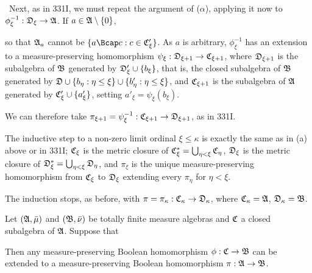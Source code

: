 {\medskip

\qquad\grheadb\ Next, as in 331I, we must repeat the argument of
($\alpha$), applying it now to
$\phi_{\xi}^{-1}:\frak D_{\xi}\to\frak A$.   If
$a\in\frak A\setminus\{0\}$,


\noindent so that $\frak A_a$ cannot be
$\{a\Bcap c:c\in\frak C'_{\xi}\}$.   As $a$ is arbitrary,
$\phi_{\xi}^{-1}$ has an extension
to a measure-preserving homomorphism
$\psi_{\xi}:\frak D_{\xi+1}\to\frak C_{\xi+1}$, where $\frak D_{\xi+1}$
is the subalgebra of $\frak B$
generated by $\frak D'_{\xi}\cup\{b_{\xi}\}$, that is, the closed
subalgebra of $\frak B$ generated by
$\frak D\cup\{b_{\eta}:\eta\le\xi\}\cup\{b'_{\eta}:\eta\le\xi\}$, and
$\frak C_{\xi+1}$ is the subalgebra of $\frak A$ generated by
$\frak C'_{\xi}\cup\{a'_{\xi}\}$, setting
$a'_{\xi}=\psi_{\xi}(b_{\xi})$.

We can therefore take
$\pi_{\xi+1}=\psi_{\xi}^{-1}:\frak C_{\xi+1}\to\frak D_{\xi+1}$, as in
331I.

\medskip

 The inductive step to a non-zero limit ordinal
$\xi\le\kappa$ is exactly the same as in (a) above or in 331I;
$\frak C_{\xi}$ is the metric closure of
$\frak C^*_{\xi}=\bigcup_{\eta<\xi}\frak C_{\eta}$,
$\frak D_{\xi}$ is the metric closure of $\frak
D^*_{\xi}=\bigcup_{\eta<\xi}\frak D_{\eta}$, and $\pi_{\xi}$ is the
unique measure-preserving homomorphism from $\frak C_{\xi}$ to $\frak
D_{\xi}$ extending every $\pi_{\eta}$ for $\eta<\xi$.

\medskip

 The induction stops, as before, with
$\pi=\pi_{\kappa}:\frak C_{\kappa}\to\frak D_{\kappa}$, where $\frak
C_{\kappa}=\frak A$, $\frak D_{\kappa}=\frak B$.
}%

 Let $(\frak A,\bar\mu)$ and $(\frak B,\bar\nu)$
be
totally finite measure algebras and $\frak C$ a closed subalgebra of
$\frak A$.   Suppose that


\noindent Then any measure-preserving Boolean homomorphism $\phi:\frak
C\to\frak B$ can be extended to a measure-preserving Boolean
homomorphism $\pi:\frak A\to\frak B$.

